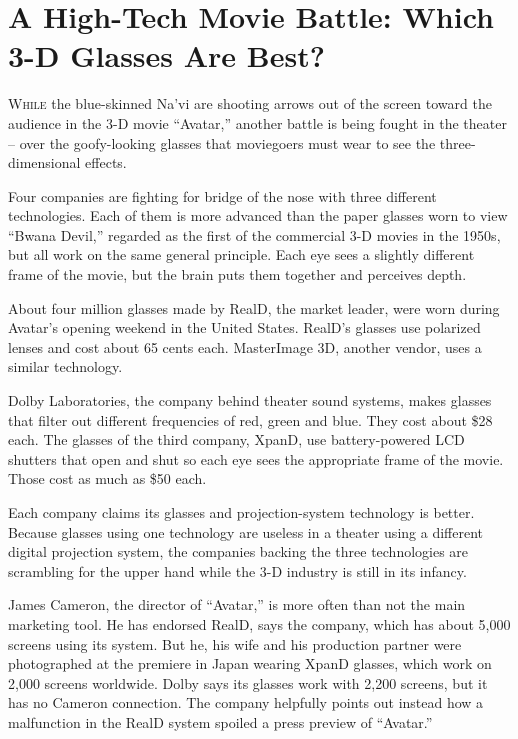 ﻿\documentclass[12pt]{article}
\begin{document}
\section{A High-Tech Movie Battle: Which 3-D Glasses Are Best?}

\lettrine{W}{hile} the blue-skinned Na'vi are shooting arrows out of the
screen toward the audience in the 3-D movie ``Avatar,'' another battle is being fought in the
theater -- over the goofy-looking glasses that moviegoers must wear to see the three-dimensional
effects.

Four companies are fighting for bridge of the nose with three different technologies. Each of them
is more advanced than the paper glasses worn to view ``Bwana Devil,'' regarded as the first of the
commercial 3-D movies in the 1950s, but all work on the same general principle. Each eye sees a
slightly different frame of the movie, but the brain puts them together and perceives depth.

About four million glasses made by RealD, the market leader, were worn during Avatar's opening
weekend in the United States. RealD's glasses use polarized lenses and cost about 65 cents each.
MasterImage 3D, another vendor, uses a similar technology.

Dolby Laboratories, the company behind theater sound systems, makes glasses that filter out
different frequencies of red, green and blue. They cost about \$28 each. The glasses of the third
company, XpanD, use battery-powered LCD shutters that open and shut so each eye sees the appropriate
frame of the movie. Those cost as much as \$50 each.

Each company claims its glasses and projection-system technology is better. Because glasses using
one technology are useless in a theater using a different digital projection system, the companies
backing the three technologies are scrambling for the upper hand while the 3-D industry is still in
its infancy.

James Cameron, the director of ``Avatar,'' is more often than not the main marketing tool. He has
endorsed RealD, says the company, which has about 5,000 screens using its system. But he, his wife
and his production partner were photographed at the premiere in Japan wearing XpanD glasses, which
work on 2,000 screens worldwide. Dolby says its glasses work with 2,200 screens, but it has no
Cameron connection. The company helpfully points out instead how a malfunction in the RealD system
spoiled a press preview of ``Avatar.''
\end{document}
